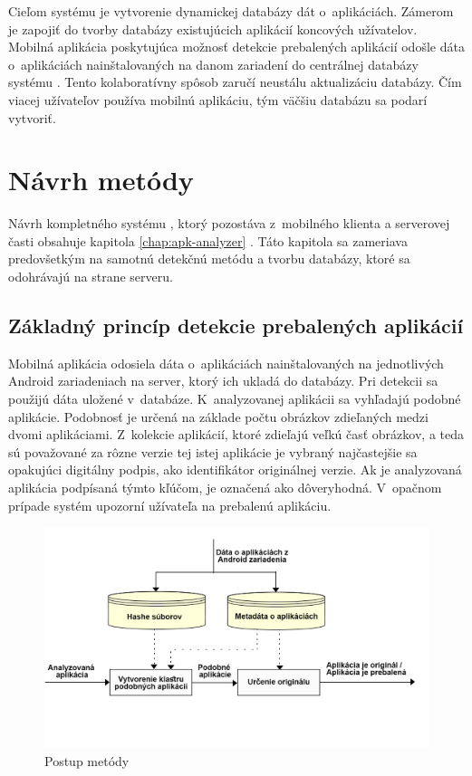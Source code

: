 Cieľom systému  je vytvorenie dynamickej databázy dát o~aplikáciách. Zámerom je zapojiť do tvorby databázy existujúcich aplikácií koncových užívatelov. Mobilná aplikácia poskytujúca možnosť detekcie prebalených aplikácií odošle dáta o~aplikáciách nainštalovaných na danom zariadení do centrálnej databázy systému . Tento kolaboratívny spôsob zaručí neustálu aktualizáciu databázy. Čím viacej užívateľov používa mobilnú aplikáciu, tým väčšiu databázu sa podarí vytvoriť.

\section{Návrh metódy}
Návrh kompletného systému , ktorý pozostáva z~mobilného klienta a serverovej časti obsahuje kapitola \ref{chap:apk-analyzer} . Táto kapitola sa zameriava predovšetkým na samotnú detekčnú metódu a tvorbu databázy, ktoré sa odohrávajú na strane serveru.

\subsection{Základný princíp detekcie prebalených aplikácií}
Mobilná aplikácia  odosiela dáta o~aplikáciách nainštalovaných na jednotlivých Android zariadeniach na server, ktorý ich ukladá do databázy. Pri detekcii sa použijú dáta uložené v~databáze. K~analyzovanej aplikácii sa vyhľadajú podobné aplikácie. Podobnosť je určená na základe počtu obrázkov zdieľaných medzi dvomi aplikáciami. Z~kolekcie aplikácií, ktoré zdieľajú veľkú časť obrázkov, a teda sú považované za rôzne verzie tej istej aplikácie je vybraný najčastejšie sa opakujúci digitálny podpis, ako identifikátor originálnej verzie. Ak je analyzovaná aplikácia podpísaná týmto kľúčom, je označená ako dôveryhodná. V~opačnom prípade systém upozorní užívateľa na prebalenú aplikáciu. 

\begin{figure}[htb]
  \begin{center}
    \includegraphics[width=130mm]{images/detection-overview.png}
  \end{center}
  \caption{Postup metódy }
  \label{fig:metódaApkAnalyzer}
\end{figure}

